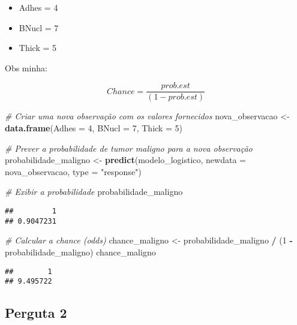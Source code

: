 \documentclass[
]{article}
\newenvironment{Shaded}{\begin{snugshade}}{\end{snugshade}}
\newcommand{\AttributeTok}[1]{\textcolor[rgb]{0.13,0.29,0.53}{#1}}
\newcommand{\CommentTok}[1]{\textcolor[rgb]{0.56,0.35,0.01}{\textit{#1}}}
\newcommand{\DecValTok}[1]{\textcolor[rgb]{0.00,0.00,0.81}{#1}}
\newcommand{\FunctionTok}[1]{\textcolor[rgb]{0.13,0.29,0.53}{\textbf{#1}}}
\newcommand{\NormalTok}[1]{#1}
\newcommand{\OtherTok}[1]{\textcolor[rgb]{0.56,0.35,0.01}{#1}}
\newcommand{\SpecialCharTok}[1]{\textcolor[rgb]{0.81,0.36,0.00}{\textbf{#1}}}
\newcommand{\StringTok}[1]{\textcolor[rgb]{0.31,0.60,0.02}{#1}}
\providecommand{\tightlist}{%
  \setlength{\itemsep}{0pt}\setlength{\parskip}{0pt}}
\begin{document}
\begin{itemize}
\tightlist
\item
  Adhes = 4
\item
  BNucl = 7
\item
  Thick = 5
\end{itemize}

Obs minha:

\[ Chance = \frac{prob.est}{(1 - prob.est)}\]

\begin{Shaded}
\begin{Highlighting}[]
\CommentTok{\# Criar uma nova observação com os valores fornecidos}
\NormalTok{nova\_observacao }\OtherTok{\textless{}{-}} \FunctionTok{data.frame}\NormalTok{(}\AttributeTok{Adhes =} \DecValTok{4}\NormalTok{, }\AttributeTok{BNucl =} \DecValTok{7}\NormalTok{, }\AttributeTok{Thick =} \DecValTok{5}\NormalTok{)}

\CommentTok{\# Prever a probabilidade de tumor maligno para a nova observação}
\NormalTok{probabilidade\_maligno }\OtherTok{\textless{}{-}} \FunctionTok{predict}\NormalTok{(modelo\_logistico, }\AttributeTok{newdata =}\NormalTok{ nova\_observacao, }\AttributeTok{type =} \StringTok{"response"}\NormalTok{)}

\CommentTok{\# Exibir a probabilidade}
\NormalTok{probabilidade\_maligno}
\end{Highlighting}
\end{Shaded}

\begin{verbatim}
##         1 
## 0.9047231
\end{verbatim}

\begin{Shaded}
\begin{Highlighting}[]
\CommentTok{\# Calcular a chance (odds)}
\NormalTok{chance\_maligno }\OtherTok{\textless{}{-}}\NormalTok{ probabilidade\_maligno }\SpecialCharTok{/}\NormalTok{ (}\DecValTok{1} \SpecialCharTok{{-}}\NormalTok{ probabilidade\_maligno)}
\NormalTok{chance\_maligno}
\end{Highlighting}
\end{Shaded}

\begin{verbatim}
##        1 
## 9.495722
\end{verbatim}

\subsection{Perguta 2}\label{perguta-2}
\end{document}
